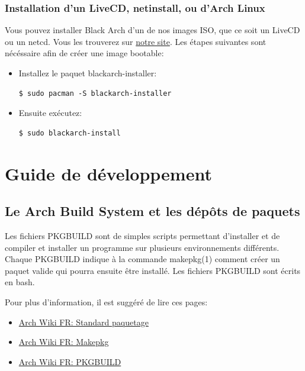 \documentclass[a4paper, oneside, 11pt]{book}
\begin{document}
\subsection{Installation d'un LiveCD, netinstall, ou d'Arch Linux}
Vous pouvez installer Black Arch d'un de nos images ISO, que ce soit un LiveCD
ou un netcd. Vous les trouverez sur
\href{http://www.blackarch.org/download.html#iso}{notre site}. Les étapes
suivantes sont nécéssaire afin de créer une image bootable:
\begin{itemize}
\item Installez le paquet blackarch-installer:
{\small
\color{gray}
\begin{verbatim}
$ sudo pacman -S blackarch-installer
\end{verbatim}
}
\item Ensuite exécutez:
{\small
\color{gray}
\begin{verbatim}
$ sudo blackarch-install
\end{verbatim}
}
\end{itemize}



\chapter{Guide de développement}

\section{Le Arch Build System et les dépôts de paquets}

Les fichiers PKGBUILD sont de simples scripts permettant d'installer et de
compiler et installer un programme sur plusieurs environnements différents.
Chaque PKGBUILD indique à la commande makepkg(1) comment créer un paquet valide
qui pourra ensuite être installé. Les fichiers PKGBUILD sont écrits en bash.

Pour plus d'information, il est suggéré de lire ces pages:
\begin{itemize}
\item \href{http://wiki.archlinux.fr/Standard_paquetage}{Arch Wiki FR:
Standard paquetage}
\item \href{http://wiki.archlinux.fr/Makepkg}{Arch Wiki FR: Makepkg}
\item \href{http://wiki.archlinux.fr/PKGBUILD}{Arch Wiki FR: PKGBUILD}
\end{itemize}
\end{document}
